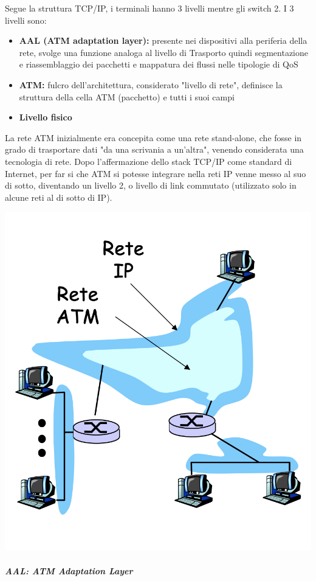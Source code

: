 \documentclass{report}
\begin{document}
Segue la struttura TCP/IP, i terminali hanno 3 livelli mentre gli switch
2. I 3 livelli sono:

\begin{itemize}
\item
  \textbf{AAL (ATM adaptation layer): }presente nei dispositivi alla
  periferia della rete, svolge una funzione analoga al livello di
  Trasporto quindi segmentazione e riassemblaggio dei pacchetti e
  mappatura dei flussi nelle tipologie di QoS
\item
  \textbf{ATM:} fulcro dell'architettura, considerato "livello di rete",
  definisce la struttura della cella ATM (pacchetto) e tutti i suoi
  campi
\item
  \textbf{Livello fisico}
\end{itemize}

La rete ATM inizialmente era concepita come una rete stand-alone, che
fosse in grado di trasportare dati "da una scrivania a un'altra",
venendo considerata una tecnologia di rete. Dopo l'affermazione dello
stack TCP/IP come standard di Internet, per far si che ATM si potesse
integrare nella reti IP venne messo al suo di sotto, diventando un
livello 2, o livello di link commutato (utilizzato solo in alcune reti
al di sotto di IP).

\begin{center}
		\includegraphics[width=0.7\linewidth]{atm-ip}
	\end{center}

\hypertarget{header-n378}{%
\subparagraph{AAL: ATM Adaptation Layer}\label{header-n378}}
\end{document}
